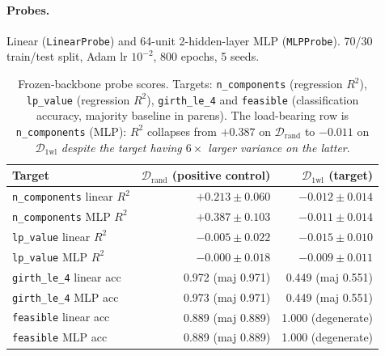 \documentclass[11pt]{article}
\theoremstyle{plain}
\theoremstyle{definition}
\theoremstyle{remark}
\begin{document}
\paragraph{Probes.}
Linear (\texttt{LinearProbe}) and 64-unit 2-hidden-layer MLP
(\texttt{MLPProbe}). 70/30 train/test split, Adam lr $10^{-2}$, 800 epochs,
5 seeds.

\begin{table}[t]
\centering
\small
\caption{Frozen-backbone probe scores. Targets: \texttt{n\_components}
(regression $R^2$), \texttt{lp\_value} (regression $R^2$), \texttt{girth\_le\_4}
and \texttt{feasible} (classification accuracy, majority baseline in parens).
The load-bearing row is \texttt{n\_components} (MLP): $R^2$ collapses from
${+}0.387$ on $\mathcal D_{\text{rand}}$ to ${-}0.011$ on $\mathcal
D_{\text{1wl}}$ \emph{despite the target having $6{\times}$ larger variance
on the latter}.}
\label{tab:probes}
\begin{tabular}{@{}lrr@{}}
\toprule
Target & $\mathcal D_{\text{rand}}$ (positive control) & $\mathcal D_{\text{1wl}}$ (target) \\
\midrule
\texttt{n\_components} linear $R^2$ & ${+}0.213\pm 0.060$ & ${-}0.012\pm 0.014$ \\
\texttt{n\_components} MLP $R^2$    & $\mathbf{{+}0.387 \pm 0.103}$ & $\mathbf{{-}0.011 \pm 0.014}$ \\
\texttt{lp\_value} linear $R^2$     & ${-}0.005\pm 0.022$ & ${-}0.015\pm 0.010$ \\
\texttt{lp\_value} MLP $R^2$        & ${-}0.000\pm 0.018$ & ${-}0.009\pm 0.011$ \\
\texttt{girth\_le\_4} linear acc    & 0.972 (maj 0.971)  & 0.449 (maj 0.551) \\
\texttt{girth\_le\_4} MLP acc       & 0.973 (maj 0.971)  & 0.449 (maj 0.551) \\
\texttt{feasible} linear acc        & 0.889 (maj 0.889)  & 1.000 (degenerate) \\
\texttt{feasible} MLP acc           & 0.889 (maj 0.889)  & 1.000 (degenerate) \\
\bottomrule
\end{tabular}
\end{table}
\end{document}
